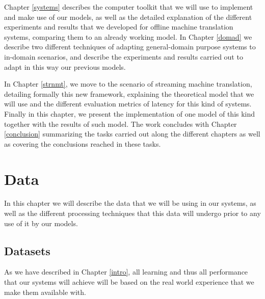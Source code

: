 \documentclass[11pt,english,listoffigures,listoftables]{tfgetsinf}
\begin{document}
Chapter \ref{systems} describes the computer toolkit that we will use to implement and make use of our models, as well as the detailed explanation of the different experiments and results that we developed for offline machine translation systems, comparing them to an already working model. In Chapter \ref{domad} we describe two different techniques of adapting general-domain purpose systems to in-domain scenarios, and describe the experiments and results carried out to adapt in this way our previous models.

In Chapter \ref{strnmt}, we move to the scenario of streaming machine translation, detailing formally this new framework, explaining the theoretical model that we will use and the different evaluation metrics of latency for this kind of systems. Finally in this chapter, we present the implementation of one model of this kind together with the results of such model. The work concludes with Chapter \ref{conclusion} summarizing the tasks carried out along the different chapters as well as covering the conclusions reached in these tasks.





\chapter{Data}\label{dos}
In this chapter we will describe the data that we will be using in our systems, as well as the different processing techniques that this data will undergo prior to any use of it by our models. 

\section{Datasets}
As we have described in Chapter \ref{intro}, all learning and thus all performance that our systems will achieve will be based on the real world experience that we make them available with.
\end{document}
